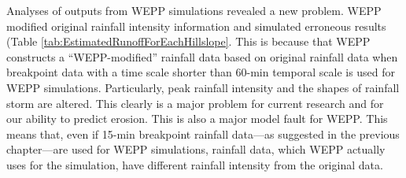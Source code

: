 Analyses of outputs from WEPP simulations revealed a new problem. WEPP modified
original rainfall intensity information and simulated erroneous results
(Table \ref{tab:EstimatedRunoffForEachHillslope}.  This is because that WEPP
constructs a ``WEPP-modified'' rainfall data based on original rainfall data
when breakpoint data with a time scale shorter than 60-min temporal scale is
used for WEPP simulations. Particularly, peak rainfall intensity and the shapes
of rainfall storm are altered. This clearly is a major problem for current
research and for our ability to predict erosion. This is also a major model
fault for WEPP. This means that, even if 15-min breakpoint rainfall data---as
suggested in the previous chapter---are used for WEPP simulations, rainfall
data, which WEPP actually uses for the simulation, have different rainfall
intensity from the original data.


